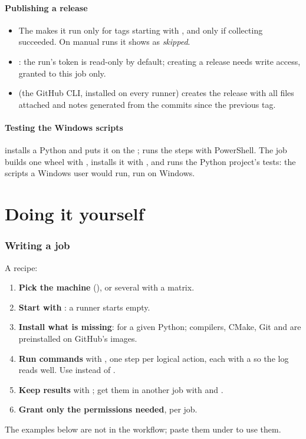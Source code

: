 \documentclass[11pt,a4paper]{article}
\newcommand{\filepiece}[3]{}
\begin{document}
\subsection{Publishing a release}
\filepiece{job-release}{yaml}{The \code{release} job: a GitHub Release on version tags}
\begin{itemize}
  \item The  makes it run only for tags starting with , and only if collecting
        succeeded. On manual runs it shows as \emph{skipped}.
  \item {}: the run's token is read-only by default; creating a
        release needs write access, granted to this job only.
  \item {} (the GitHub CLI, installed on every runner) creates the release with all files
        attached and notes generated from the commits since the previous tag.
\end{itemize}

\subsection{Testing the Windows scripts}
\filepiece{job-windows-script}{yaml}{The \code{windows-script} job}
 installs a Python and puts it on the ;
 runs the steps with PowerShell. The job builds one wheel with
, installs it with , and runs the Python project's
tests: the scripts a Windows user would run, run on Windows.

\part{Doing it yourself}

\section{Writing a job}
A recipe:
\begin{enumerate}
  \item \textbf{Pick the machine} (), or several with a matrix.
  \item \textbf{Start with }: a runner starts empty.
  \item \textbf{Install what is missing}:  for a given Python; compilers,
        CMake, Git and  are preinstalled on GitHub's images.
  \item \textbf{Run commands} with , one step per logical action, each with a
         so the log reads well. Use  instead of .
  \item \textbf{Keep results} with ; get them in another job with
         and .
  \item \textbf{Grant only the permissions needed}, per job.
\end{enumerate}
The examples below are not in the workflow; paste them under  to use them.
\end{document}
